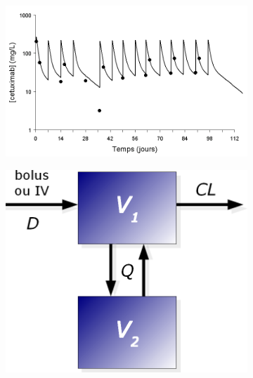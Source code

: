 \begin{figure}[htbp]
  \begin{subfigure}[b]{0.75\linewidth}
    \centering
    \includegraphics[width=0.75\linewidth]{figures/raster/FIG_19b1} 
  \end{subfigure}%
  \begin{subfigure}[b]{0.25\linewidth}
    \centering
    \includegraphics[width=0.75\linewidth]{figures/raster/FIG_19b2} 
  \end{subfigure} 
  

\end{figure}
